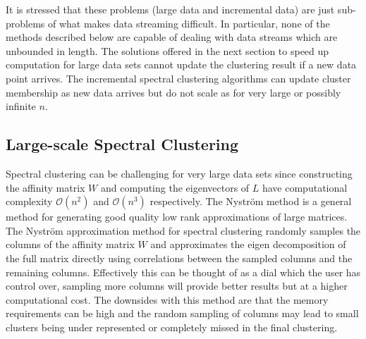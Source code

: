 It is stressed that these problems (large data and incremental data) are just sub-problems of what makes data streaming difficult. In particular, none of the methods described below are capable of dealing with data streams which are unbounded in length.  The solutions offered in the next section to speed up computation for large data sets cannot update the clustering result if a new data point arrives. The incremental spectral clustering algorithms can update cluster membership as new data arrives but do not scale as for very large or possibly infinite $n$. %

\subsection{Large-scale Spectral Clustering}
\label{sec:big_data}

Spectral clustering can be challenging for very large data sets since constructing the affinity matrix $W$ and computing the eigenvectors of $L$ have computational complexity $\mathcal{O}(n^2)$ and $\mathcal{O}(n^3)$ respectively. The Nystr\"{o}m method \citep{Williams2001} is a general method for generating good quality low rank approximations of large matrices. The Nystr\"{o}m approximation method for spectral clustering \citep{Fowlkes2004} randomly samples the columns of the affinity matrix $W$ and approximates the eigen decomposition of the full matrix directly using correlations between the sampled columns and the remaining columns. Effectively this can be thought of as a dial which the user has control over, sampling more columns will provide better results but at a higher computational cost. The downsides with this method are that the  memory requirements can be high and the random sampling of columns may lead to small clusters being under represented or completely missed in the final clustering. 


